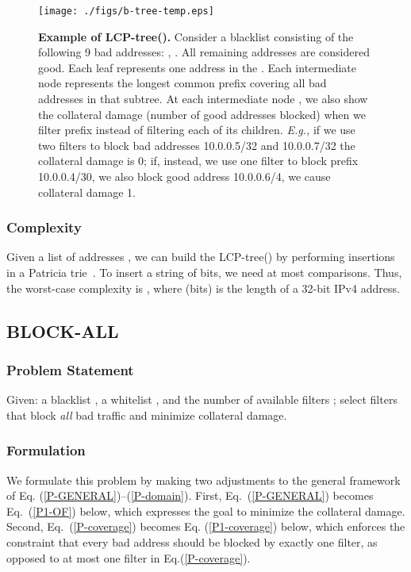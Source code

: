 \begin{figure}
\centering
\texttt{[image: ./figs/b-tree-temp.eps]}
\caption{\label{fig:P3-proof} {\small {\bf Example of LCP-tree().}
Consider a blacklist consisting of the following 9 bad addresses:
, . All remaining addresses are considered good.
Each leaf represents one address in the .
Each intermediate node represents the longest common prefix  covering all bad addresses in that subtree.
At each intermediate node , we also show the collateral damage (\ie number of good addresses blocked) when we filter prefix  instead of filtering each of its children.
{\em E.g.,} if we use two filters to block bad addresses 10.0.0.5/32 and 10.0.0.7/32 the collateral damage is 0; if, instead, we use one filter to block prefix 10.0.0.4/30, we also block good address 10.0.0.6/4, \ie we cause collateral damage 1.}}
\end{figure}








\subsubsection*{Complexity}
Given a list of addresses , we can build  the LCP-tree() by performing  insertions in a Patricia trie~\cite{varghese}.
To insert a string of  bits, we need at most  comparisons. Thus, the worst-case complexity is , where  (bits) is the  length of a 32-bit IPv4 address.



\subsection{BLOCK-ALL}
\label{sec:block-all}

\subsubsection*{Problem Statement}
Given: a blacklist , a whitelist , and the number of available filters ;
select filters that block {\em all} bad traffic and minimize collateral damage.

\subsubsection*{Formulation}
We formulate this problem by making two adjustments to the general framework of Eq. (\ref{P-GENERAL})--(\ref{P-domain}).
First, Eq.~(\ref{P-GENERAL}) becomes Eq.~(\ref{P1-OF}) below, which expresses the goal to minimize the collateral damage. Second, Eq.~(\ref{P-coverage}) becomes Eq. (\ref{P1-coverage}) below,
which enforces the constraint that every bad address should be blocked by exactly one filter,
as opposed to at most one filter in Eq.(\ref{P-coverage}).




















